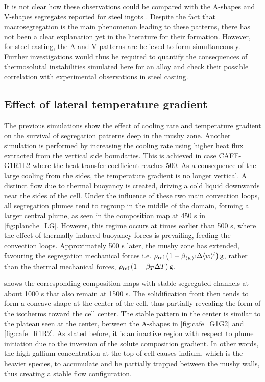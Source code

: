 It is not clear how these observations could be compared with the A-shapes  and V-shapes segregates reported for steel ingots 
\citep{pickering_macrosegregation_2013}. Despite the fact that macrosegregation is the main phenomenon leading to these 
patterns, there has not been a clear explanation yet in the literature for their formation. However, for steel casting, 
the A and V patterns are believed to form simultaneously. Further investigations would thus be required to quantify the 
consequences of thermosolutal instabilities simulated here for an  alloy and check their possible correlation 
with experimental observations in steel casting.

\subsection{Effect of lateral temperature gradient}

The previous simulations show the effect of cooling rate and temperature gradient on the survival of segregation patterns deep 
in the mushy zone. Another simulation is performed by increasing the cooling rate using higher heat flux extracted from the 
vertical side boundaries. This is achieved in case CAFE-G1R1L2 where the heat transfer coefficient reaches \SI{500}{\uhconvec}. 
As a consequence of the large cooling from the sides, the temperature gradient is no longer vertical. A distinct flow due to 
thermal buoyancy is created, driving a cold liquid downwards near the sides of the cell. Under the influence of these two main 
convection loops, all segregation plumes tend to regroup in the middle of the domain, forming a larger central plume, as seen in 
the composition map at 450 s in \cref{fig:planche_LG}. However, this regime occurs at times earlier than 500 s, where the effect of thermally 
induced buoyancy forces is prevailing, feeding the convection loops. Approximately 500 s later, the mushy zone has extended, favouring 
the segregation mechanical forces i.e.  $\rho_{\text{ref}} \left( 1-\beta_{\langle w \rangle^l} \Delta \langle w \rangle^l \right) \boldsymbol{\text{g}}$, rather than the thermal mechanical forces, $\rho_{\text{ref}} \left( 1-\beta_T \Delta T \right) \boldsymbol{\text{g}}$. 


 shows the corresponding composition maps with stable segregated channels at about 1000 s that also remain at 1500 s. The solidification 
front then tends to form a concave shape at the center of the cell, thus partially revealing the form of the isotherms toward the cell 
center. The stable pattern in the center is similar to the plateau seen at the center, between the A-shapes in \cref{fig:cafe_G1G2} and \cref{fig:cafe_R1R2}. 
As stated before, it is an inactive region with respect to plume initiation due to the inversion of the solute composition gradient.
In other words, the high gallium concentration at the top of cell causes indium, which is the heavier species, to accumulate and be partially 
trapped between the mushy walls, thus creating a stable flow configuration.

